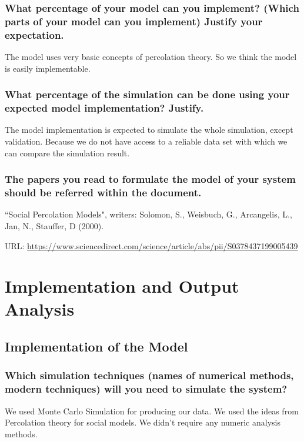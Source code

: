 \documentclass[article, 11pt, a4paper, onesize]{memoir}
\begin{document}
\subsection{What percentage of your model can you implement? (Which parts of your model
can you implement) Justify your expectation.}

The model uses very basic concepts of percolation theory. So we think the model is easily
implementable.


\subsection{What percentage of the simulation can be done using your expected model
implementation? Justify.}

The model implementation is expected to simulate the whole simulation, except validation.
Because we do not have access to a reliable data set with which we can compare the
simulation result.


\subsection{The papers you read to formulate the model of your system should be referred
within the document.}

``Social Percolation Models", writers: Solomon, S., Weisbuch, G., Arcangelis, L., Jan, N.,
Stauffer, D (2000).

URL: \url{https://www.sciencedirect.com/science/article/abs/pii/S0378437199005439}


\newpage
\chapter{Implementation and Output Analysis}

\section{Implementation of the Model}

\subsection{Which simulation techniques (names of numerical methods, modern techniques)
will you need to simulate the system?} 

We used Monte Carlo Simulation for producing our data. We used the ideas from
Percolation theory for social models. We didn't require any numeric analysis
methods.
\end{document}
